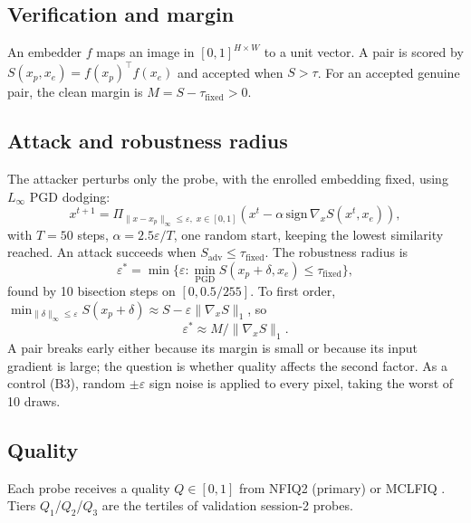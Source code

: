 \documentclass[10pt,twocolumn,letterpaper]{article}
\newcommand{\eps}{\varepsilon}
\newcommand{\taufix}{\tau_{\mathrm{fixed}}}
\begin{document}
\subsection{Verification and margin}
An embedder $f$ maps an image in $[0,1]^{H\times W}$ to a unit vector. A pair is scored by $S(x_p, x_e) = f(x_p)^\top f(x_e)$ and accepted when $S > \tau$. For an accepted genuine pair, the clean margin is $M = S - \taufix > 0$.

\subsection{Attack and robustness radius}
The attacker perturbs only the probe, with the enrolled embedding fixed, using $L_\infty$ PGD dodging:
\begin{equation}
x^{t+1} = \Pi_{\|x - x_p\|_\infty \le \eps,\; x \in [0,1]}\!\left(x^t - \alpha\, \mathrm{sign}\, \nabla_x S(x^t, x_e)\right),
\end{equation}
with $T = 50$ steps, $\alpha = 2.5\eps/T$, one random start, keeping the lowest similarity reached. An attack succeeds when $S_{\mathrm{adv}} \le \taufix$. The robustness radius is
\begin{equation}
\eps^* = \min\{\eps : \min_{\mathrm{PGD}} S(x_p + \delta, x_e) \le \taufix\},
\end{equation}
found by 10 bisection steps on $[0, 0.5/255]$. To first order, $\min_{\|\delta\|_\infty \le \eps} S(x_p + \delta) \approx S - \eps \|\nabla_x S\|_1$, so
\begin{equation}
\eps^* \approx M / \|\nabla_x S\|_1 .
\end{equation}
A pair breaks early either because its margin is small or because its input gradient is large; the question is whether quality affects the second factor. As a control (B3), random $\pm\eps$ sign noise is applied to every pixel, taking the worst of 10 draws.

\subsection{Quality}
Each probe receives a quality $Q \in [0,1]$ from NFIQ2 \cite{nfiq2} (primary) or MCLFIQ \cite{mclfiq}. Tiers $Q_1$/$Q_2$/$Q_3$ are the tertiles of validation session-2 probes.
\end{document}
